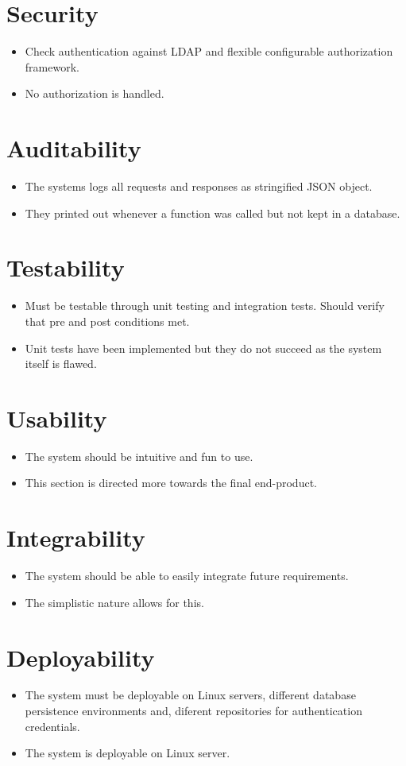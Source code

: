 \section{Security}
	\begin{itemize}
		\item Check authentication against LDAP and flexible configurable authorization framework.
		\item No authorization is handled.
	\end{itemize}
\section{Auditability}
	\begin{itemize}
		\item The systems logs all requests and responses as stringified JSON object.
		\item They printed out whenever a function was called but not kept in a database.
	\end{itemize}
\section{Testability}
	\begin{itemize}
		\item Must be testable through unit testing and integration tests. Should verify that pre and post conditions met.
		\item Unit tests have been implemented but they do not succeed as the system itself is flawed.
	\end{itemize}
\section{Usability}
	\begin{itemize}
		\item The system should be intuitive and fun to use.
		\item This section is directed more towards the final end-product.
	\end{itemize}
\section{Integrability}
	\begin{itemize}
		\item The system should be able to easily integrate future requirements.
		\item The simplistic nature allows for this.
	\end{itemize}
\section{Deployability}
	\begin{itemize}
		\item The system must be deployable on Linux servers, different database persistence environments and, diferent repositories for authentication credentials.
		\item The system is deployable on Linux server.
	\end{itemize}
